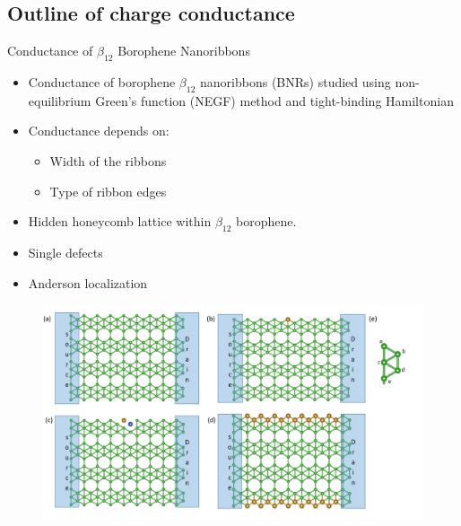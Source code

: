 \documentclass[handout,t]{beamer}
\begin{document}
\subsection{Outline of charge conductance}
\begin{frame}{Conductance of $\beta_{12}$ Borophene Nanoribbons}
	\begin{itemize}
		\item Conductance of borophene $\beta_{12}$ nanoribbons (BNRs) studied using non-equilibrium Green's function (NEGF) method and tight-binding Hamiltonian
		\item Conductance depends on:
		\begin{itemize}
			\item Width of the ribbons
			\item Type of ribbon edges
		\end{itemize}
		\item Hidden honeycomb lattice within $\beta_{12}$ borophene.
		\item Single defects
		\item Anderson localization
	\end{itemize}
	\begin{figure}[!ht]
		\centering
		\includegraphics[width=.5\linewidth]{../figures/borophene_structure(3).JPG}
		\label{fig:borophene}
	  \end{figure}
\end{frame}
\end{document}
